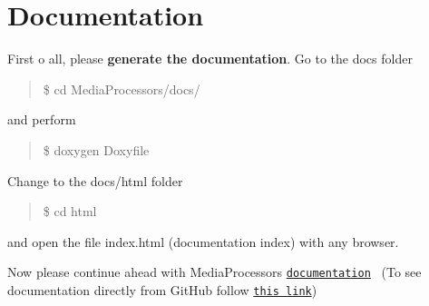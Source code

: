 \section*{Documentation }

First o all, please {\bfseries generate the documentation}. Go to the \textquotesingle{}docs\textquotesingle{} folder

\begin{quote}
\$ cd Media\+Processors/docs/ \end{quote}


and perform

\begin{quote}
\$ doxygen Doxyfile \end{quote}


Change to the \textquotesingle{}docs/html\textquotesingle{} folder

\begin{quote}
\$ cd html \end{quote}


and open the file \textquotesingle{}index.\+html\textquotesingle{} (documentation index) with any browser.

Now please continue ahead with Media\+Processors \href{md_DOCUMENTATION.html}{\tt documentation}~\newline
 (To see documentation directly from Git\+Hub follow \href{https://rantoniello.github.io/MediaProcessors/html/}{\tt this link}) 